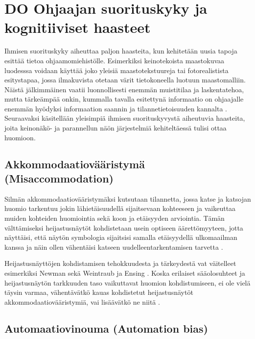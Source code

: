\documentclass[utf8,bachelor,manualbib]{gradu3}
\begin{document}
\chapter{DO Ohjaajan suorituskyky ja kognitiiviset haasteet}

Ihmisen suorituskyky aiheuttaa paljon haasteita, kun kehitetään uusia tapoja 
esittää tietoa ohjaamomiehistölle. Esimerkiksi keinotekoista maastokuvaa luodesssa voidaan käyttää joko yleisiä maastotekstuureja tai fotorealistista esitystapaa, jossa ilmakuvista otetaan värit tietokoneella luotuun maastomalliin. Näistä jälkimmäinen vaatii luonnollisesti enemmän muistitilaa ja laskentatehoa, mutta tärkeämpää onkin, kummalla tavalla esitettynä informaatio on ohjaajalle enemmän hyödyksi informaation saannin ja tilannetietoisuuden kannalta \citep{prinzel2004}. Seuraavaksi käsitellään yleisimpiä ihmisen suorituskyvystä aiheutuvia haasteita, joita keinonäkö- ja parannellun näön järjestelmiä kehiteltäessä tulisi ottaa huomioon.

\section{Akkommodaatiovääristymä (Misaccommodation)}

Silmän akkommodaatiovääristymäksi kutsutaan tilannetta, jossa katse ja katsojan huomio tarkentuu jokin lähietäisuudellä sijaitsevaan kohteeseen ja vaikeuttaa muiden kohteiden huomiointia sekä koon ja etäisyyden arviointia. Tämän välttämiseksi heijastusnäytöt kohdistetaan usein optiseen äärettömyyteen, jotta näyttäisi, että näytön symbologia sijaitsisi samalla etäisyydellä ulkomaailman kanssa ja näin ollen vähentäisi katseen uudelleentarkentamisen tarvetta \citep{naish1964}.

Heijastusnäyttöjen kohdistamisen tehokkuudesta ja tärkeydestä vat väitelleet esimerkiksi Newman \citeyearpar{newman1995} sekä Weintraub ja Ensing \citeyearpar{weintraubensing1992}. Koska erilaiset sääolosuhteet ja heijastusnäytön tarkkuuden taso vaikuttavat huomion kohdistumiseen, ei ole vielä täysin varmaa, vähentävätkö kauas kohdistetut heijastusnäytöt akkommodaatiovääristymiä, vai lisäävätkö ne niitä \citep{crawfordneal2006}.

\section{Automaatiovinouma (Automation bias)}
\end{document}
